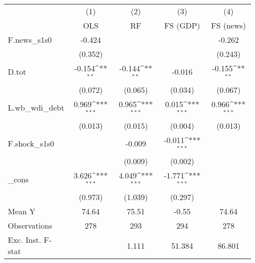 {
\def\sym#1{\ifmmode^{#1}\else\(^{#1}\)\fi}
\begin{tabular}{l*{4}{c}}
\toprule
            &\multicolumn{1}{c}{(1)}&\multicolumn{1}{c}{(2)}&\multicolumn{1}{c}{(3)}&\multicolumn{1}{c}{(4)}\\
            &\multicolumn{1}{c}{OLS}&\multicolumn{1}{c}{RF}&\multicolumn{1}{c}{FS (GDP)}&\multicolumn{1}{c}{FS (news)}\\
\midrule
F.news\_s1s0 &      -0.424         &                     &                     &      -0.262         \\
            &     (0.352)         &                     &                     &     (0.243)         \\
\addlinespace
D.tot       &      -0.154\sym{**} &      -0.144\sym{**} &      -0.016         &      -0.155\sym{**} \\
            &     (0.072)         &     (0.065)         &     (0.034)         &     (0.067)         \\
\addlinespace
L.wb\_wdi\_debt&       0.969\sym{***}&       0.965\sym{***}&       0.015\sym{***}&       0.966\sym{***}\\
            &     (0.013)         &     (0.015)         &     (0.004)         &     (0.013)         \\
\addlinespace
F.shock\_s1s0&                     &      -0.009         &      -0.011\sym{***}&                     \\
            &                     &     (0.009)         &     (0.002)         &                     \\
\addlinespace
\_cons      &       3.626\sym{***}&       4.049\sym{***}&      -1.771\sym{***}&                     \\
            &     (0.973)         &     (1.039)         &     (0.297)         &                     \\
\midrule
Mean Y      &       74.64         &       75.51         &       -0.55         &       74.64         \\
Observations&         278         &         293         &         294         &         278         \\
Exc. Inst. F-stat&                     &       1.111         &      51.384         &      86.801         \\
\bottomrule
\end{tabular}
}
